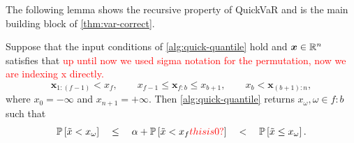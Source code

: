 \documentclass[10pt]{article} %
\newcommand{\gersi}[1]{\textcolor{red}{#1}}
\begin{document}
The following lemma shows the recursive property of QuickVaR and is the main building block of \cref{thm:var-correct}.
\begin{lemma} \label{lem:quickvar-correct}
  Suppose that the input conditions of \cref{alg:quick-quantile} hold and $\bm{x} \in \mathbb{R}^n$ satisfies that \gersi{up until now we used sigma notation for the permutation, now we are indexing x directly.}
 \begin{equation} \label{eq:qvar-precondition}
  \mathbf{x}_{1{:}(f-1)} < x_f, \qquad
  x_{f-1} \le \bm{x}_{f{:}b} \le x_{b+1},  \qquad
  x_b < \bm{x}_{(b+1){:}n},
\end{equation} 
where $x_0 = -\infty$ and $x_{n+1} = +\infty$. Then \cref{alg:quick-quantile} returns $x_{\omega}, \omega\in f{:}b$ such that
\begin{equation} \label{eq:qvar-postcondition}
  \P{\tilde{x} < x_{\omega}}
  \quad \le \quad
  \alpha + \P{\tilde{x} < x_f \gersi{this is 0?}}
  \quad < \quad \P{\tilde{x} \le x_{\omega}}. 
\end{equation}
\end{lemma}
\end{document}
